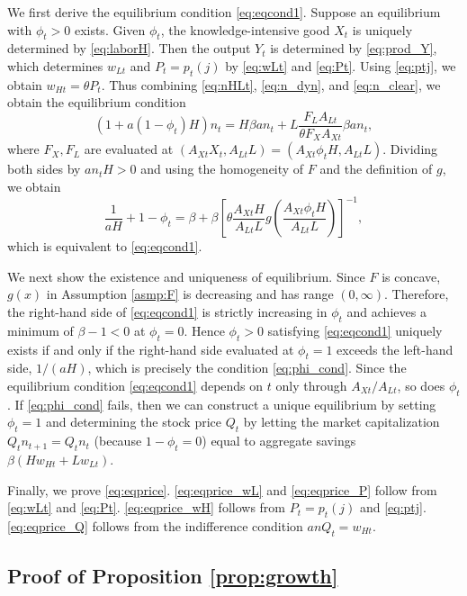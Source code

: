 \documentclass[a4paper,12pt]{article}
\numberwithin{equation}{section}
\theoremstyle{plain}
\begin{document}
We first derive the equilibrium condition \eqref{eq:eqcond1}. Suppose an equilibrium with $\phi_t>0$ exists. Given $\phi_t$, the knowledge-intensive good $X_t$ is uniquely determined by \eqref{eq:laborH}. Then the output $Y_t$ is determined by \eqref{eq:prod_Y}, which determines $w_{Lt}$ and $P_t=p_t(j)$ by \eqref{eq:wLt} and \eqref{eq:Pt}. Using \eqref{eq:ptj}, we obtain $w_{Ht}=\theta P_t$. Thus combining \eqref{eq:nHLt}, \eqref{eq:n_dyn}, and \eqref{eq:n_clear}, we obtain the equilibrium condition
\begin{equation*}
    (1+a(1-\phi_t)H)n_t=H\beta an_t+L\frac{F_LA_{Lt}}{\theta F_XA_{Xt}}\beta an_t,
\end{equation*}
where $F_X,F_L$ are evaluated at $(A_{Xt}X_t,A_{Lt}L)=(A_{Xt}\phi_t H,A_{Lt}L)$. Dividing both sides by $an_tH>0$ and using the homogeneity of $F$ and the definition of $g$, we obtain
\begin{equation*}
    \frac{1}{aH}+1-\phi_t=\beta+\beta\left[\theta\frac{A_{Xt}H}{A_{Lt}L}g\left(\frac{A_{Xt}\phi_t H}{A_{Lt}L}\right)\right]^{-1},
\end{equation*}
which is equivalent to \eqref{eq:eqcond1}.

We next show the existence and uniqueness of equilibrium. Since $F$ is concave, $g(x)$ in Assumption \ref{asmp:F} is decreasing and has range $(0,\infty)$. Therefore, the right-hand side of \eqref{eq:eqcond1} is strictly increasing in $\phi_t$ and achieves a minimum of $\beta-1<0$ at $\phi_t=0$. Hence $\phi_t>0$ satisfying \eqref{eq:eqcond1} uniquely exists if and only if the right-hand side evaluated at $\phi_t=1$ exceeds the left-hand side, $1/(aH)$, which is precisely the condition \eqref{eq:phi_cond}. Since the equilibrium condition \eqref{eq:eqcond1} depends on $t$ only through $A_{Xt}/A_{Lt}$, so does $\phi_t$. If \eqref{eq:phi_cond} fails, then we can construct a unique equilibrium by setting $\phi_t=1$ and determining the stock price $Q_t$ by letting the market capitalization $Q_tn_{t+1}=Q_tn_t$ (because $1-\phi_t=0$) equal to aggregate savings $\beta (Hw_{Ht}+Lw_{Lt})$.

Finally, we prove \eqref{eq:eqprice}. \eqref{eq:eqprice_wL} and \eqref{eq:eqprice_P} follow from \eqref{eq:wLt} and \eqref{eq:Pt}. \eqref{eq:eqprice_wH} follows from $P_t=p_t(j)$ and \eqref{eq:ptj}. \eqref{eq:eqprice_Q} follows from the indifference condition $anQ_t=w_{Ht}$. \hfill \qedsymbol

\subsection{Proof of Proposition \ref{prop:growth}}
\end{document}
